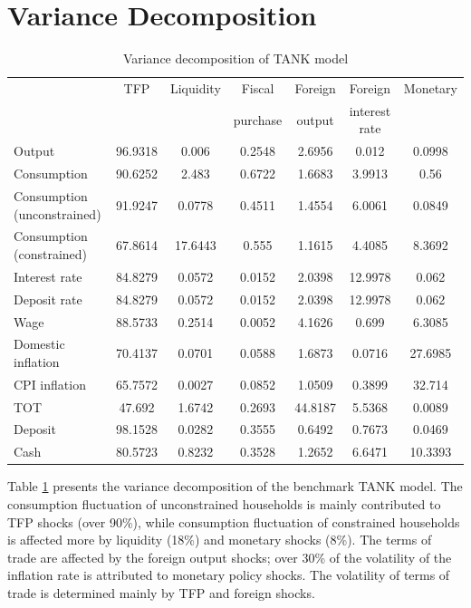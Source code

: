 \documentclass[12pt]{article}
\begin{document}
  
\section{Variance Decomposition}
\begin{table}[h!]
\centering 
\scriptsize
\begin{tabular}{lcccccc}
\hline \hline
                                    & TFP     & Liquidity & Fiscal & Foreign & Foreign & Monetary \\
                                    &     &  & purchase &  output & interest rate &  \\\hline
Output                     & 96.9318 & 0.006   & 0.2548 & 2.6956  & 0.012   & 0.0998  \\
Consumption                & 90.6252 & 2.483   & 0.6722 & 1.6683  & 3.9913  & 0.56    \\
Consumption (unconstrained)  & 91.9247 & 0.0778  & 0.4511 & 1.4554  & 6.0061  & 0.0849  \\
Consumption (constrained)  & 67.8614 & 17.6443 & 0.555  & 1.1615  & 4.4085  & 8.3692  \\
Interest rate              & 84.8279 & 0.0572  & 0.0152 & 2.0398  & 12.9978 & 0.062   \\
Deposit rate               & 84.8279 & 0.0572  & 0.0152 & 2.0398  & 12.9978 & 0.062   \\
Wage                       & 88.5733 & 0.2514  & 0.0052 & 4.1626  & 0.699   & 6.3085  \\
Domestic inflation         & 70.4137 & 0.0701  & 0.0588 & 1.6873  & 0.0716  & 27.6985 \\
CPI inflation           & 65.7572 & 0.0027  & 0.0852 & 1.0509  & 0.3899  & 32.714  \\
TOT                        & 47.692  & 1.6742  & 0.2693 & 44.8187 & 5.5368  & 0.0089  \\
Deposit                    & 98.1528 & 0.0282  & 0.3555 & 0.6492  & 0.7673  & 0.0469  \\
Cash                       & 80.5723 & 0.8232  & 0.3528 & 1.2652  & 6.6471  & 10.3393 \\\hline
\end{tabular}
\caption{Variance decomposition of TANK model}
\label{variance}
\end{table}
Table \ref{variance} presents the variance decomposition of the benchmark TANK model. The consumption fluctuation of unconstrained households is mainly contributed to TFP shocks (over 90\%), while consumption fluctuation of constrained households is affected more by liquidity (18\%) and monetary shocks (8\%). The terms of trade are affected by the foreign output shocks; over 30\% of the volatility of the inflation rate is attributed to monetary policy shocks. The volatility of terms of trade is determined mainly by TFP and foreign shocks. 
\end{document}
